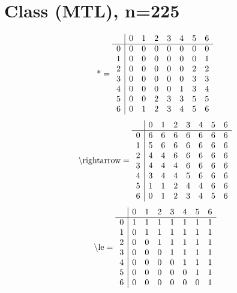 \documentclass[11pt]{article}
\begin{document}
\section{Class (MTL), n=225}
\[\text{*} = 
\begin{array}{r | r r r r r r r}
 & 0 & 1 & 2 & 3 & 4 & 5 & 6 \\ \hline
0 & 0 & 0 & 0 & 0 & 0 & 0 & 0 \\
1 & 0 & 0 & 0 & 0 & 0 & 0 & 1 \\
2 & 0 & 0 & 0 & 0 & 0 & 2 & 2 \\
3 & 0 & 0 & 0 & 0 & 0 & 3 & 3 \\
4 & 0 & 0 & 0 & 0 & 1 & 3 & 4 \\
5 & 0 & 0 & 2 & 3 & 3 & 5 & 5 \\
6 & 0 & 1 & 2 & 3 & 4 & 5 & 6 \\
\end{array}
\]
\[\text{\textbackslash rightarrow} = 
\begin{array}{r | r r r r r r r}
 & 0 & 1 & 2 & 3 & 4 & 5 & 6 \\ \hline
0 & 6 & 6 & 6 & 6 & 6 & 6 & 6 \\
1 & 5 & 6 & 6 & 6 & 6 & 6 & 6 \\
2 & 4 & 4 & 6 & 6 & 6 & 6 & 6 \\
3 & 4 & 4 & 4 & 6 & 6 & 6 & 6 \\
4 & 3 & 4 & 4 & 5 & 6 & 6 & 6 \\
5 & 1 & 1 & 2 & 4 & 4 & 6 & 6 \\
6 & 0 & 1 & 2 & 3 & 4 & 5 & 6 \\
\end{array}
\]
\[\text{\textbackslash le} = 
\begin{array}{r | r r r r r r r}
 & 0 & 1 & 2 & 3 & 4 & 5 & 6 \\ \hline
0 & 1 & 1 & 1 & 1 & 1 & 1 & 1 \\
1 & 0 & 1 & 1 & 1 & 1 & 1 & 1 \\
2 & 0 & 0 & 1 & 1 & 1 & 1 & 1 \\
3 & 0 & 0 & 0 & 1 & 1 & 1 & 1 \\
4 & 0 & 0 & 0 & 0 & 1 & 1 & 1 \\
5 & 0 & 0 & 0 & 0 & 0 & 1 & 1 \\
6 & 0 & 0 & 0 & 0 & 0 & 0 & 1 \\
\end{array}
\]
\end{document}
